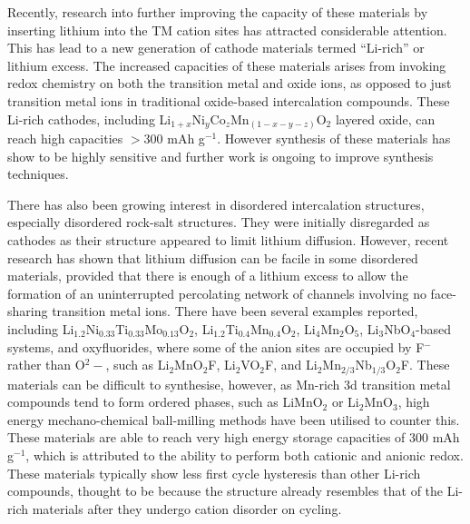 \documentclass[../main.tex]{subfiles}
\begin{document}
Recently, research into further improving the capacity of these materials by inserting lithium into the TM cation sites has attracted considerable attention. This has lead to a new generation of cathode materials termed ``Li-rich'' or lithium excess. The increased capacities of these materials arises from invoking redox chemistry on both the transition metal and oxide ions, as opposed to just transition metal ions in traditional oxide-based intercalation compounds. \cite{Sathiya2013,lee2014unlocking,Oishi2015,Seo2016,Gent2017,Assat2018,naylor2019depth,House2020,House2020a} These Li-rich cathodes, including Li$_{1+x}$Ni$_y$Co$_z$Mn$_{(1-x-y-z)}$O$_2$ layered oxide, can reach high capacities $>300$ mAh g$^{-1}$. However synthesis of these materials has show to be highly sensitive and further work is ongoing to improve synthesis techniques.\cite{Hy2016} 

There has also been growing interest in disordered intercalation structures, especially disordered rock-salt structures. They were initially disregarded as cathodes as their structure appeared to limit lithium diffusion. However, recent research has shown that lithium diffusion can be facile in some disordered materials, provided that there is enough of a lithium excess to allow the formation of an uninterrupted percolating network of channels involving no face-sharing transition metal ions.\cite{lee2014unlocking,Urban2014,Lee2015} There have been several examples reported, including Li$_{1.2}$Ni$_{0.33}$Ti$_{0.33}$Mo$_{0.13}$O$_2$,\cite{Lee2015} Li$_{1.2}$Ti$_{0.4}$Mn$_{0.4}$O$_2$,\cite{Yabuuchi2016a} Li$_4$Mn$_2$O$_5$,\cite{Freire2016,Yao2018,Bhandari2019454} Li$_3$NbO$_4$-based systems,\cite{Nakajima2017,Yabuuchi2015,Wang2015} and oxyfluorides, where some of the anion sites are occupied by F$^-$ rather than O$^2-$, such as Li$_2$MnO$_2$F,\cite{Sharpe2020,House2018,Lun2020} Li$_2$VO$_2$F,\cite{Chen2015,Chen2015a,Baur2019, Cambaz2019, Baur2020, Kallquist2019, Chang2020} and Li$_2$Mn$_{2/3}$Nb$_{1/3}$O$_2$F.\cite{Lee2018} These materials can be difficult to synthesise, however, as Mn-rich 3d transition metal compounds tend to form ordered phases, such as LiMnO$_2$ or Li$_2$MnO$_3$, high energy mechano-chemical ball-milling methods have been utilised to counter this.\cite{Freire2016,House2018,Freire2017} These materials are able to reach very high energy storage capacities of $300$ mAh g$^{-1}$, \cite{Jacquet2019} which is attributed to the ability to perform both cationic and anionic redox. \cite{Jacquet2019,clement2020,Chang2020} These materials typically show less first cycle hysteresis than other Li-rich compounds, thought to be because the structure already resembles that of the Li-rich materials after they undergo cation disorder on cycling.
\end{document}
